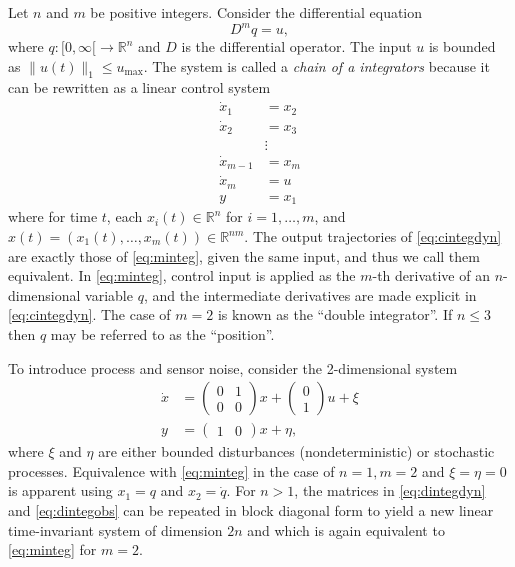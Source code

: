 \documentclass{amsart}
\theoremstyle{definition}
\begin{document}
Let $n$ and $m$ be positive integers.  Consider the differential equation
\begin{equation}\label{eq:minteg}
D^{m}q = u ,
\end{equation}
where $q: [0,\infty [ \rightarrow \mathbb{R}^{n}$ and $D$ is the differential
operator.  The input $u$ is bounded as $\lVert u(t) \rVert_1 \leq
u_{\mathrm{max}}$.  The system is called a \textit{chain of a integrators}
because it can be rewritten as a linear control system
\begin{equation}\label{eq:cintegdyn}
\begin{split}
\dot{x}_1 &= x_2 \\
\dot{x}_2 &= x_3 \\
&\vdots \\
\dot{x}_{m-1} &= x_m \\
\dot{x}_m &= u \\
y &= x_1
\end{split}
\end{equation}
where for time $t$, each $x_{i}(t)\in \mathbb{R}^n$ for $i=1,\ldots,m$, and
$x(t)=\left( x_{1}(t) , \ldots , x_{m}(t)\right)\in \mathbb{R}^{nm}$. The output
trajectories of \eqref{eq:cintegdyn} are exactly those of \eqref{eq:minteg},
given the same input, and thus we call them equivalent. In \eqref{eq:minteg},
control input is applied as the $m$-th derivative of an $n$-dimensional variable
$q$, and the intermediate derivatives are made explicit in
\eqref{eq:cintegdyn}. The case of $m=2$ is known as the
``double integrator''. If $n \leq 3$ then $q$ may be referred to as the
``position''.

To introduce process and sensor noise, consider the 2-dimensional system
\begin{align}
\dot{x} &= \left(
\begin{array}{cc}
0 & 1 \\
0 & 0
\end{array}
\right) x + \left(
\begin{array}{c}
0 \\
1
\end{array}
\right) u + \xi \label{eq:dintegdyn}\\
y &= \left(
\begin{array}{cc}
1 & 0
\end{array}
\right) x + \eta \label{eq:dintegobs},
\end{align}
where $\xi$ and $\eta$ are either bounded disturbances (nondeterministic) or
stochastic processes.  Equivalence with \eqref{eq:minteg} in the case of
$n=1, m=2$ and $\xi=\eta=0$ is apparent using $x_1 = q$ and $x_2 = \dot{q}$.  For $n
> 1$, the matrices in \eqref{eq:dintegdyn} and \eqref{eq:dintegobs} can be
repeated in block diagonal form to yield a new linear time-invariant system of
dimension $2n$ and which is again equivalent to \eqref{eq:minteg} for $m=2$.
\end{document}
